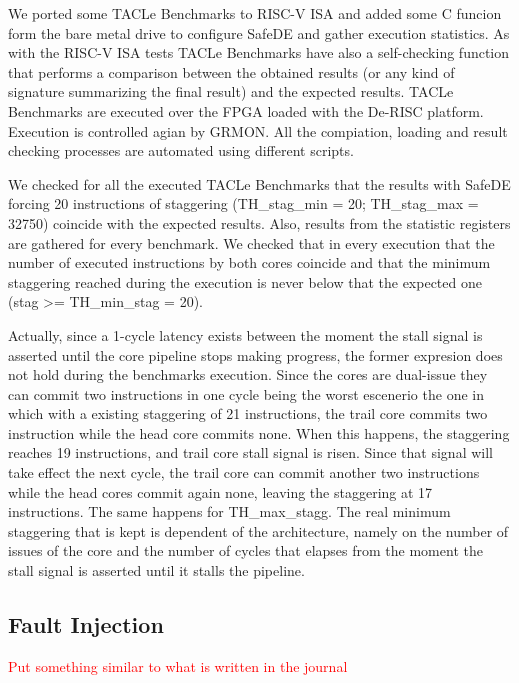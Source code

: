 We ported some TACLe Benchmarks to RISC-V ISA and added some C funcion form the bare metal drive to configure SafeDE and gather execution statistics. As with the RISC-V ISA tests TACLe Benchmarks have also a self-checking function that performs a comparison between the obtained results (or any kind of signature summarizing the final result) and the expected results. TACLe Benchmarks are executed over the FPGA loaded with the De-RISC platform. Execution is controlled agian by GRMON. All the compiation, loading and result checking processes are automated using different scripts. 

We checked for all the executed TACLe Benchmarks that the results with SafeDE forcing 20 instructions of staggering (TH\_stag\_min = 20; TH\_stag\_max = 32750) coincide with the expected results. Also, results from the statistic registers are gathered for every benchmark. We checked that in every execution that the number of executed instructions by both cores coincide and that the minimum staggering reached during the execution is never below that the expected one (stag >= TH\_min\_stag = 20). 

Actually, since a 1-cycle latency exists between the moment the stall signal is asserted until the core pipeline stops making progress, the former expresion does not hold during the benchmarks execution. Since the cores are dual-issue they can commit two instructions in one cycle being the worst escenerio the one in which with a existing staggering of 21 instructions, the trail core commits two instruction while the head core commits none. When this happens, the staggering reaches 19 instructions, and trail core stall signal is risen. Since that signal will take effect the next cycle, the trail core can commit another two instructions while the head cores commit again none, leaving the staggering at 17 instructions. The same happens for TH\_max\_stagg. The real minimum staggering that is kept is dependent of the architecture, namely on the number of issues of the core and the number of cycles that elapses from the moment the stall signal is asserted until it stalls the pipeline.  


\subsection{Fault Injection}
\textcolor{red}{Put something similar to what is written in the journal}

